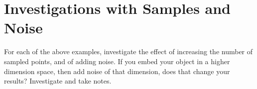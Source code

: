 \documentclass[12pt,twoside]{article}
\begin{document}
\section{Investigations with Samples and Noise} 

For each of the above examples, investigate the effect of increasing the number of sampled points, and of adding noise.  If you embed your object in a higher dimension space, then add noise of that dimension, does that change your results?  Investigate and take notes.

\label{LastPage}
\end{document}
